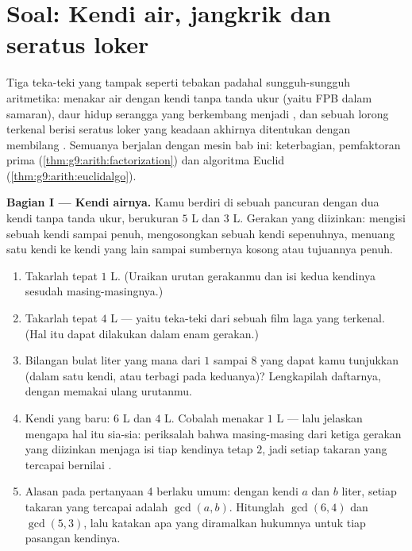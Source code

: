 \section{Soal: Kendi air, jangkrik dan seratus loker}

\begin{problem}
\label{pb:g9:arith:1}
Tiga teka-teki yang tampak seperti tebakan padahal sungguh-sungguh
aritmetika: menakar air dengan kendi tanpa tanda ukur (yaitu FPB dalam
samaran), daur hidup serangga yang berkembang menjadi ,
dan sebuah lorong terkenal berisi seratus loker yang keadaan akhirnya
ditentukan dengan membilang . Semuanya berjalan dengan mesin
bab ini: keterbagian, pemfaktoran prima
(\cref{thm:g9:arith:factorization}) dan algoritma Euclid
(\cref{thm:g9:arith:euclidalgo}).

\medskip
\noindent\textbf{Bagian I --- Kendi airnya.}
Kamu berdiri di sebuah pancuran dengan dua kendi tanpa tanda ukur,
berukuran $5$ L dan $3$ L. Gerakan yang diizinkan: mengisi sebuah
kendi sampai penuh, mengosongkan sebuah kendi sepenuhnya, menuang satu
kendi ke kendi yang lain sampai sumbernya kosong atau tujuannya penuh.
\begin{enumerate}
  \item Takarlah tepat $1$ L. (Uraikan urutan gerakanmu
        dan isi kedua kendinya sesudah masing-masingnya.)
  \item Takarlah tepat $4$ L --- yaitu teka-teki dari sebuah film
        laga yang terkenal. (Hal itu dapat dilakukan dalam enam gerakan.)
  \item Bilangan bulat liter yang mana dari $1$ sampai $8$ yang dapat
        kamu tunjukkan (dalam satu kendi, atau terbagi pada
        keduanya)? Lengkapilah daftarnya, dengan memakai ulang
        urutanmu.
  \item Kendi yang baru: $6$ L dan $4$ L. Cobalah menakar $1$ L ---
        lalu jelaskan mengapa hal itu sia-sia: periksalah bahwa
        masing-masing dari ketiga gerakan yang diizinkan menjaga isi
        tiap kendinya tetap 
        $2$, jadi setiap takaran yang tercapai bernilai .
  \item Alasan pada pertanyaan 4 berlaku umum: dengan kendi $a$
        dan $b$ liter, setiap takaran yang tercapai adalah 
        $\gcd(a, b)$. Hitunglah $\gcd(6, 4)$ dan $\gcd(5, 3)$, lalu
        katakan apa yang diramalkan hukumnya untuk tiap pasangan kendinya.
\end{enumerate}


\end{problem}
